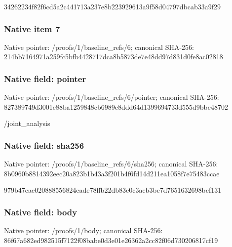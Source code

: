 \documentclass[10pt,a4paper]{article}
\begin{document}
\begingroup\raggedright\sloppy 34262234f82f6cd5a2c441713a237e8b223929613a9f58d04797dbcab33a9f29\par\endgroup

\subsubsection{Native item 7}
Native pointer: /proofs/1/baseline\_\allowbreak{}refs/6; canonical SHA-256: 214bb7164971a259fc5bfb4428717dca8b5873de7e48dd97d831d0fe8ac02818

\subsubsection{Native field: pointer}
Native pointer: /proofs/1/baseline\_\allowbreak{}refs/6/pointer; canonical SHA-256: 827389749d3001e88ba1259848cb6989c8ddd64d1399694733d555d9bbe48702

\begingroup\raggedright\sloppy /\allowbreak{}joint\_\allowbreak{}analysis\par\endgroup

\subsubsection{Native field: sha256}
Native pointer: /proofs/1/baseline\_\allowbreak{}refs/6/sha256; canonical SHA-256: 8b0960b8814392eec20a823b1b43a3f201b4f6fd14d211ea1058f7e75483ccae

\begingroup\raggedright\sloppy 979b47eae020888556824eade78ffb22db83e0c3aeb3bc7d7651632698bcf131\par\endgroup

\subsubsection{Native field: body}
Native pointer: /proofs/1/body; canonical SHA-256: 86f67a682ed982515f7122f08babe0d3e01e26362a2cc82f06d730206817cf19
\end{document}
